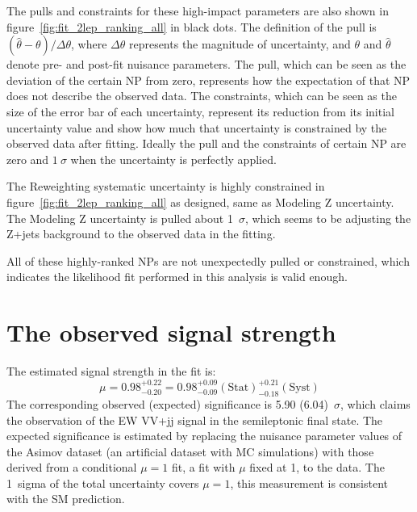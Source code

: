 The pulls and constraints for these high-impact parameters are also shown in figure~\ref{fig:fit_2lep_ranking_all} in black dots.
The definition of the pull is $(\hat{\theta}-\theta) / \Delta \theta$, where $\Delta \theta$ represents the magnitude of uncertainty, and $\theta$ and $\hat{\theta}$ denote pre- and post-fit nuisance parameters.
The pull, which can be seen as the deviation of the certain NP from zero, represents how the expectation of that NP does not describe the observed data.
The constraints, which can be seen as the size of the error bar of each uncertainty, represent its reduction from its initial uncertainty value and show how much that uncertainty is constrained by the observed data after fitting.
Ideally the pull and the constraints of certain NP are zero and $1~\sigma$ when the uncertainty is perfectly applied.

The Reweighting systematic uncertainty is highly constrained in figure~\ref{fig:fit_2lep_ranking_all} as designed, same as Modeling Z uncertainty. The Modeling Z uncertainty is pulled about 1~$\sigma$, which seems to be adjusting the Z+jets background to the observed data in the fitting.

All of these highly-ranked NPs are not unexpectedly pulled or constrained, which indicates the likelihood fit performed in this analysis is valid enough.


\section{The observed signal strength}
\label{sec:mu}
The estimated signal strength in the fit is:
\begin{equation}
    \mu = 0.98^{+ 0.22}_{- 0.20} = 0.98^{+ 0.09}_{- 0.09}(\mathrm{Stat})^{+ 0.21}_{- 0.18}(\mathrm{Syst}) 
\end{equation}
The corresponding observed (expected) significance is 5.90 (6.04)~$\sigma$, which claims the observation of the EW VV+jj signal in the semileptonic final state. 
The expected significance is estimated by replacing the nuisance parameter values of the Asimov dataset (an artificial dataset with MC simulations) with those derived from a conditional $\mu = 1$ fit, a fit with $\mu$ fixed at 1, to the data. 
The 1~sigma of the total uncertainty covers $\mu = 1$, this measurement is consistent with the SM prediction.

